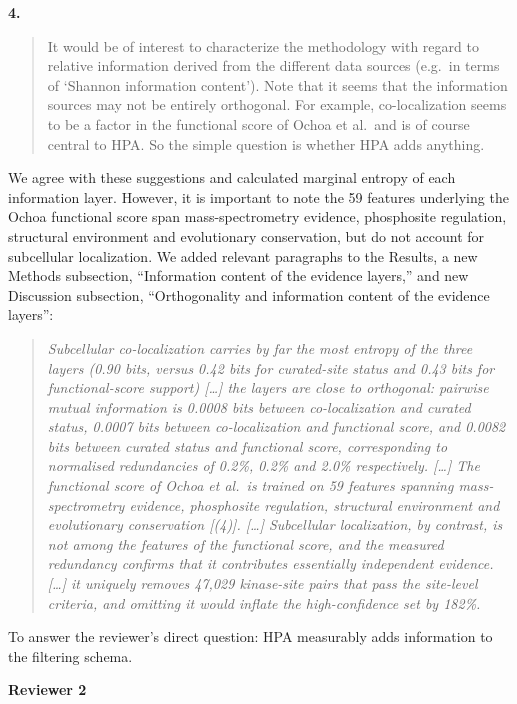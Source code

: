 \documentclass[
]{article}
\begin{document}
\textbf{4.}

\begin{quote}
It would be of interest to characterize the methodology with regard to
relative information derived from the different data sources (e.g.~in
terms of `Shannon information content'). Note that it seems that the
information sources may not be entirely orthogonal. For example,
co-localization seems to be a factor in the functional score of Ochoa et
al.~and is of course central to HPA. So the simple question is whether
HPA adds anything.
\end{quote}

We agree with these suggestions and calculated marginal entropy of each
information layer. However, it is important to note the 59 features
underlying the Ochoa functional score span mass-spectrometry evidence,
phosphosite regulation, structural environment and evolutionary
conservation, but do not account for subcellular localization. We added
relevant paragraphs to the Results, a new Methods subsection,
``Information content of the evidence layers,'' and new Discussion
subsection, ``Orthogonality and information content of the evidence
layers'':

\begin{quote}
\emph{Subcellular co-localization carries by far the most entropy of the
three layers (0.90 bits, versus 0.42 bits for curated-site status and
0.43 bits for functional-score support) {[}\ldots{]} the layers are
close to orthogonal: pairwise mutual information is 0.0008 bits between
co-localization and curated status, 0.0007 bits between co-localization
and functional score, and 0.0082 bits between curated status and
functional score, corresponding to normalised redundancies of 0.2\%,
0.2\% and 2.0\% respectively. {[}\ldots{]} The functional score of Ochoa
et al.~is trained on 59 features spanning mass-spectrometry evidence,
phosphosite regulation, structural environment and evolutionary
conservation {[}(4){]}. {[}\ldots{]} Subcellular localization, by
contrast, is not among the features of the functional score, and the
measured redundancy confirms that it contributes essentially independent
evidence. {[}\ldots{]} it uniquely removes 47,029 kinase-site pairs that
pass the site-level criteria, and omitting it would inflate the
high-confidence set by 182\%.}
\end{quote}

To answer the reviewer's direct question: HPA measurably adds
information to the filtering schema.

\textbf{Reviewer 2}
\end{document}

